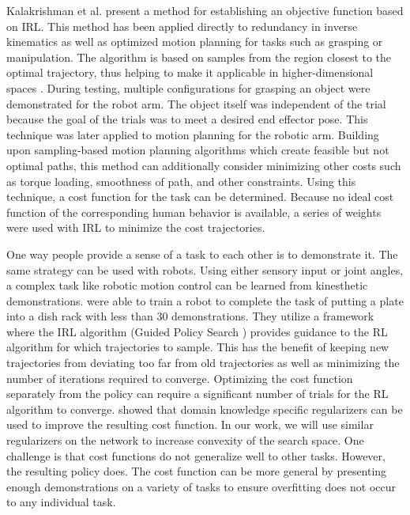 \documentclass{article}
\begin{document}
    Kalakrishman et al. present a method for establishing an objective function based on IRL. This method has been applied directly to redundancy in inverse kinematics as well as optimized motion planning for tasks such as grasping or manipulation. The algorithm is based on samples from the region closest to the optimal trajectory, thus helping to make it applicable in higher-dimensional spaces \cite{kalakrishnan2013learning}. During testing, multiple configurations for grasping an object were demonstrated for the robot arm. The object itself was independent of the trial because the goal of the trials was to meet a desired end effector pose. This technique was later applied to motion planning for the robotic arm. Building upon sampling-based motion planning algorithms which create feasible but not optimal paths, this method can additionally consider minimizing other costs such as torque loading, smoothness of path, and other constraints. Using this technique, a cost function for the task can be determined\cite{kalakrishnan2013learning}. Because no ideal cost function of the corresponding human behavior is available, a series of weights were used with IRL to minimize the cost trajectories. 
    
    One way people provide a sense of a task to each other is to demonstrate it. The same strategy can be used with robots.  Using either sensory input or joint angles, a complex task like robotic motion control can be learned from kinesthetic demonstrations\cite{Finn2016}.  \cite{Finn2016} were able to train a robot to complete the task of putting a plate into a dish rack with less than 30 demonstrations.  They utilize a framework where the IRL algorithm (Guided Policy Search \cite{levine2015learning}) provides guidance to the RL algorithm for which trajectories to sample. This has the benefit of keeping new trajectories from deviating too far from old trajectories as well as minimizing the number of iterations required to converge.  Optimizing the cost function separately from the policy can require a significant number of trials for the RL algorithm to converge. \cite{Finn2016} showed that domain knowledge specific regularizers can be used to improve the resulting cost function.  In our work, we will use similar regularizers on the network to increase convexity of the search space. One challenge is that cost functions do not generalize well to other tasks\cite{Finn2016}.  However, the resulting policy does.  The cost function can be more general by presenting enough demonstrations on a variety of tasks to ensure overfitting does not occur to any individual task.
    
\end{document}
